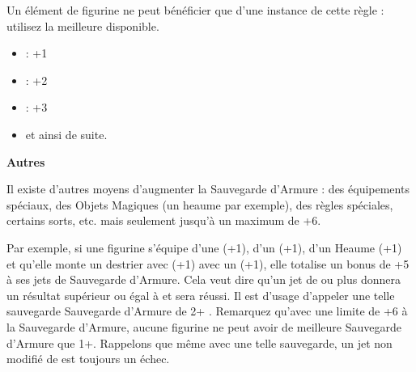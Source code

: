 \begin{multicols}{2}
Un élément de figurine ne peut bénéficier que d'une instance de cette règle : utilisez la meilleure disponible.

\noindent\begin{itemize}[label={-}, topsep=0cm, itemsep=0pt]
\item {} : +1
\item {} : +2
\item {} : +3
\item et ainsi de suite.
\end{itemize}

\end{multicols}

\noindent\textbf{Autres}

Il existe d'autres moyens d'augmenter la Sauvegarde d'Armure : des équipements spéciaux, des Objets Magiques (un heaume par exemple), des règles spéciales, certains sorts, etc. mais seulement jusqu'à un maximum de +6.

Par exemple, si une figurine s'équipe d'une \la{} (+1), d'un \shield{} (+1), d'un Heaume (+1) et qu'elle monte un destrier avec  (+1) avec un \barding{} (+1), elle totalise un bonus de +5 à ses jets de Sauvegarde d'Armure. Cela veut dire qu'un jet de  ou plus donnera un résultat supérieur ou égal à  et sera réussi. Il est d'usage d'appeler une telle sauvegarde \og Sauvegarde d'Armure de 2+ \fg{}. Remarquez qu'avec une limite de +6 à la Sauvegarde d'Armure, aucune figurine ne peut avoir de meilleure Sauvegarde d'Armure que 1+. Rappelons que même avec une telle sauvegarde, un jet non modifié de  est toujours un échec.
